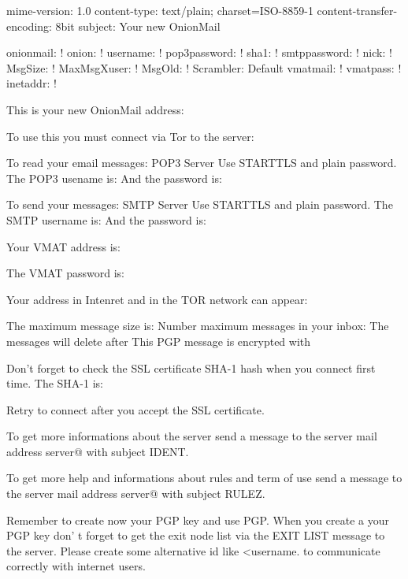 mime-version: 1.0
content-type: text/plain; charset=ISO-8859-1
content-transfer-encoding: 8bit
subject: Your new OnionMail

onionmail: !
onion: !
username: !
pop3password: !
sha1: !
smtppassword: !
nick: !
MsgSize: !
MaxMsgXuser: !
MsgOld: !
Scrambler: Default
vmatmail: !
vmatpass: !
inetaddr: !
					
This is your new OnionMail address:

To use this you must connect via Tor to the server:

To read your email messages:
POP3 Server %
Use STARTTLS and plain password.
The POP3 usename is:
And the password is:

To send your messages:
SMTP Server %
Use STARTTLS and plain password.
The SMTP username is:
And the password is:

Your VMAT address is:

The VMAT password is:

Your address in Intenret and in the TOR network can appear:

The maximum message size is: %
Number maximum messages in your inbox: %
The messages will delete after %
This PGP message is encrypted with %

Don't forget to check the SSL certificate SHA-1 hash when 
you connect first time. The SHA-1 is:

Retry to connect after you accept the SSL certificate.

To get more informations about the server send a message
to the server mail address server@%
with subject IDENT.

To get more help and informations about rules and term of
use send a message to the server mail address server@%
with subject RULEZ. 

Remember to create now your PGP key and use PGP.
When you create a your PGP key don' t forget to get the exit node list
via the EXIT LIST message to the server. Please create some alternative id
like <username.%
to communicate correctly with internet users.

